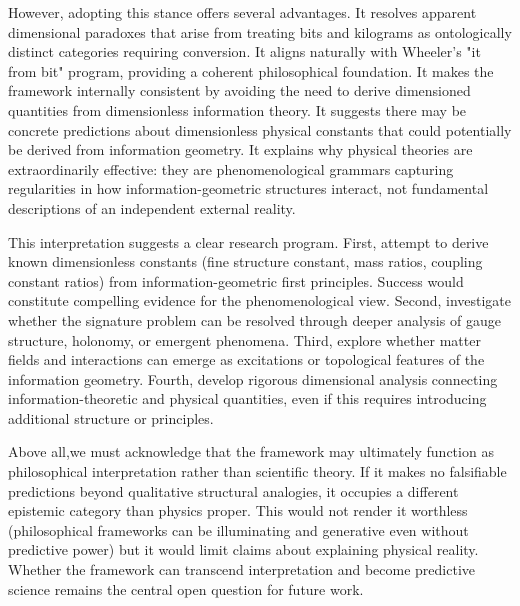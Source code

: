 \documentclass[11pt]{article}
\begin{document}
However, adopting this stance offers several advantages. It resolves apparent dimensional paradoxes that arise from treating bits and kilograms as ontologically distinct categories requiring conversion. It aligns naturally with Wheeler's "it from bit" program, providing a coherent philosophical foundation. It makes the framework internally consistent by avoiding the need to derive dimensioned quantities from dimensionless information theory. It suggests there may be concrete predictions about dimensionless physical constants that could potentially be derived from information geometry. It explains why physical theories are extraordinarily effective: they are phenomenological grammars capturing regularities in how information-geometric structures interact, not fundamental descriptions of an independent external reality.

This interpretation suggests a clear research program. First, attempt to derive known dimensionless constants (fine structure constant, mass ratios, coupling constant ratios) from information-geometric first principles. Success would constitute compelling evidence for the phenomenological view. Second, investigate whether the signature problem can be resolved through deeper analysis of gauge structure, holonomy, or emergent phenomena. Third, explore whether matter fields and interactions can emerge as excitations or topological features of the information geometry. Fourth, develop rigorous dimensional analysis connecting information-theoretic and physical quantities, even if this requires introducing additional structure or principles.

Above all,we must acknowledge that the framework may ultimately function as philosophical interpretation rather than scientific theory. If it makes no falsifiable predictions beyond qualitative structural analogies, it occupies a different epistemic category than physics proper. This would not render it worthless (philosophical frameworks can be illuminating and generative even without predictive power) but it would limit claims about explaining physical reality. Whether the framework can transcend interpretation and become predictive science remains the central open question for future work.
\end{document}
